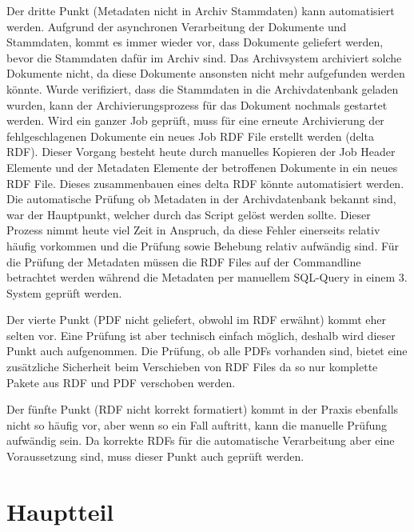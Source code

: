 \documentclass[a4paper,oneside, 12pt]{report}
\begin{document}
Der dritte Punkt (Metadaten nicht in Archiv Stammdaten) kann automatisiert werden. Aufgrund der asynchronen Verarbeitung der Dokumente und Stammdaten, kommt es immer wieder vor, dass Dokumente geliefert werden, bevor die Stammdaten dafür im Archiv sind. Das Archivsystem archiviert solche Dokumente nicht, da diese Dokumente ansonsten nicht mehr aufgefunden werden könnte. Wurde verifiziert, dass die Stammdaten in die Archivdatenbank geladen wurden, kann der Archivierungsprozess für das Dokument nochmals gestartet werden. Wird ein ganzer Job geprüft, muss für eine erneute Archivierung der fehlgeschlagenen Dokumente ein neues Job RDF File erstellt werden (delta RDF). Dieser Vorgang besteht heute durch manuelles Kopieren der Job Header Elemente und der Metadaten Elemente der betroffenen Dokumente in ein neues RDF File. Dieses zusammenbauen eines delta RDF könnte automatisiert werden.
Die automatische Prüfung ob Metadaten in der Archivdatenbank bekannt sind, war der Hauptpunkt, welcher durch das Script gelöst werden sollte. Dieser Prozess nimmt heute viel Zeit in Anspruch, da diese Fehler einerseits relativ häufig vorkommen und die Prüfung sowie Behebung relativ aufwändig sind. Für die Prüfung der Metadaten müssen die RDF Files auf der Commandline betrachtet werden während die Metadaten per manuellem SQL-Query in einem 3. System geprüft werden.

Der vierte Punkt (PDF nicht geliefert, obwohl im RDF erwähnt) kommt eher selten vor. Eine Prüfung ist aber technisch einfach möglich, deshalb wird dieser Punkt auch aufgenommen. Die Prüfung, ob alle PDFs vorhanden sind, bietet eine zusätzliche Sicherheit beim Verschieben von RDF Files da so nur komplette Pakete aus RDF und PDF verschoben werden.

Der fünfte Punkt (RDF nicht korrekt formatiert) kommt in der Praxis ebenfalls nicht so häufig vor, aber wenn so ein Fall auftritt, kann die manuelle Prüfung aufwändig sein. Da korrekte RDFs für die automatische Verarbeitung aber eine Voraussetzung sind, muss dieser Punkt auch geprüft werden.

\chapter{Hauptteil}\label{sec:motivation}
\end{document}
